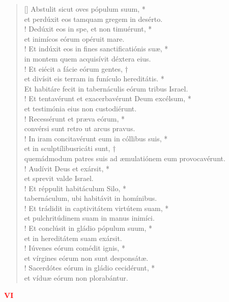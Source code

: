 \begin{verse}[\versewidth]
Abstulit sicut oves pópulum suum, *\\
et perdúxit eos tamquam gregem in desérto.\\!
\vin Dedúxit eos in spe, et non timuérunt, *\\
\vin et inimícos eórum opéruit mare.\\!
Et indúxit eos in fines sanctificatiónis suæ, *\\
in montem quem acquisívit déxtera eius.\\!
\vin Et eiécit a fácie eórum gentes, †\\
\vin et divísit eis terram in funículo hereditátis. *\\
\vin Et habitáre fecit in tabernáculis eórum tribus Israel.\\!
Et tentavérunt et exacerbavérunt Deum excélsum, *\\
et testimónia eius non custodiérunt.\\!
\vin Recessérunt et præva eórum, *\\
\vin convérsi sunt retro ut arcus pravus.\\!
In iram concitavérunt eum in cóllibus suis, *\\
et in sculptílibusricáti sunt, †\\
\vin quemádmodum patres suis ad æmulatiónem eum provocavérunt.\\!
\vin Audívit Deus et exársit, *\\
\vin et sprevit valde Israel.\\!
Et réppulit habitáculum Silo, *\\
tabernáculum, ubi habitávit in homínibus.\\!
\vin Et trádidit in captivitátem virtútem suam, *\\
\vin et pulchritúdinem suam in manus inimíci.\\!
Et conclúsit in gládio pópulum suum, *\\
et in hereditátem suam exársit.\\!
\vin Iúvenes eórum comédit ignis, *\\
\vin et vírgines eórum non sunt desponsátæ.\\!
Sacerdótes eórum in gládio cecidérunt, *\\
et víduæ eórum non plorabántur.\\
\end{verse}
\begin{center}
\textcolor{red}{\large \bf VI}\\
\end{center}
